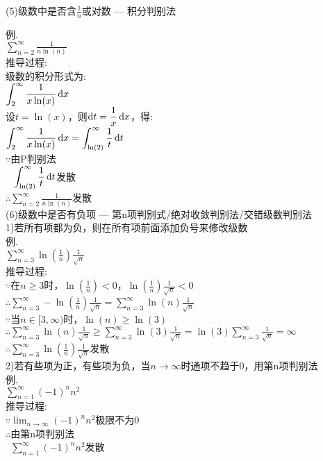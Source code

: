 (5)级数中是否含$\displaystyle\frac{1}{n}$或对数 --- 积分判别法\\
\begin{center}
\end{center}
例.\\
$\displaystyle\sum_{n=2}^{\infty}\frac{1}{n\ln(n)}$\\[1ex]
推导过程:\\
级数的积分形式为:\\
$\displaystyle\int_2^{\infty}\frac{1}{x\ln(x)}\mathop{}\!\mathrm{d} x$\\
设$t=\ln(x)$，则$\displaystyle\mathop{}\!\mathrm{d} t=\frac{1}{x}\mathop{}\!\mathrm{d} x$，得:\\
$\displaystyle\int_2^{\infty}\frac{1}{x\ln(x)}\mathop{}\!\mathrm{d} x=\int_{\ln(2)}^{\infty}\frac{1}{t}\mathop{}\!\mathrm{d} t$\\
$\because$由P判别法\\
$\phantom{\because}\displaystyle\int_{\ln(2)}^{\infty}\frac{1}{t}\mathop{}\!\mathrm{d} t$发散\\
$\therefore\displaystyle\sum_{n=2}^{\infty}\frac{1}{n\ln(n)}$发散\\[2ex]

(6)级数中是否有负项 --- 第n项判别式/绝对收敛判别法/交错级数判别法\\
1)若所有项都为负，则在所有项前面添加负号来修改级数\\
例.\\
$\displaystyle\sum_{n=3}^{\infty}\ln(\frac{1}{n})\frac{1}{\sqrt{n}}$\\[1ex]
推导过程:\\
$\because$在$n\geqslant 3$时，$\ln(\frac{1}{n})<0$，$\ln(\frac{1}{n})\frac{1}{\sqrt{n}}<0$\\
$\therefore\displaystyle\sum_{n=3}^{\infty}-\ln(\frac{1}{n})\frac{1}{\sqrt{n}}=\sum_{n=3}^{\infty}\ln(n)\frac{1}{\sqrt{n}}$\\
$\because$当$n\in[3,\infty)$时，$\ln(n)\geqslant\ln(3)$\\
$\therefore\displaystyle\sum_{n=3}^{\infty}\ln(n)\frac{1}{\sqrt{n}}\geqslant\sum_{n=3}^{\infty}\ln(3)\frac{1}{\sqrt{n}}=\ln(3)\sum_{n=3}^{\infty}\frac{1}{\sqrt{n}}=\infty$\\
$\therefore\displaystyle\sum_{n=3}^{\infty}\ln(\frac{1}{n})\frac{1}{\sqrt{n}}$发散\\[2ex]

2)若有些项为正，有些项为负，当$n\to\infty$时通项不趋于$0$，用第n项判别法\\
例.\\
$\displaystyle\sum_{n=1}^{\infty}(-1)^nn^2$\\[1ex]
推导过程:\\
$\because\displaystyle\lim_{n\to\infty}(-1)^nn^2$极限不为0\\
$\therefore$由第n项判别法\\
$\phantom{\therefore}\displaystyle\sum_{n=1}^{\infty}(-1)^nn^2$发散\\[2ex]

